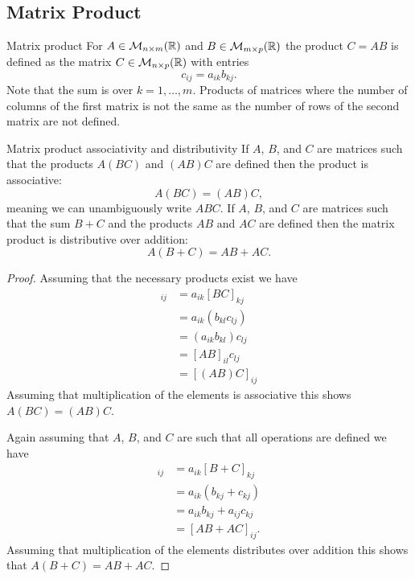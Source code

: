 \subsection{Matrix Product}
\begin{definition}{Matrix product}{}
    For \(A\in\mathcal{M}_{{n}\times{m}}({\mathbb{R}})\) and \(B\in\mathcal{M}_{{m}\times{p}}({\mathbb{R}})\) the product \(C = AB\) is defined as the matrix \(C\in\mathcal{M}_{{n}\times{p}}({\mathbb{R}})\) with entries
    \[c_{ij} = a_{ik}b_{kj}.\]
    Note that the sum is over \(k = 1, \dotsc, m\).
    Products of matrices where the number of columns of the first matrix is not the same as the number of rows of the second matrix are not defined.
\end{definition}
\begin{theorem}{Matrix product associativity and distributivity}{}
    If \(A\), \(B\), and \(C\) are matrices such that the products \(A(BC)\) and \((AB)C\) are defined then the product is associative:
    \[A(BC) = (AB)C,\]
    meaning we can unambiguously write \(ABC\).
    If \(A\), \(B\), and \(C\) are matrices such that the sum \(B + C\) and the products \(AB\) and \(AC\) are defined then the matrix product is distributive over addition:
    \[A(B + C) = AB + AC.\]
\end{theorem}
\begin{proof}
    Assuming that the necessary products exist we have
    \begin{align*}
        [A(BC)]_{ij} &= a_{ik}[BC]_{kj}\\
        &= a_{ik}(b_{kl}c_{lj})\\
        &= (a_{ik}b_{kl})c_{lj}\\
        &= [AB]_{il}c_{lj}\\
        &= [(AB)C]_{ij}
    \end{align*}
    Assuming that multiplication of the elements is associative this shows \(A(BC) = (AB)C\).
    
    Again assuming that \(A\), \(B\), and \(C\) are such that all operations are defined we have
    \begin{align*}
        [A(B + C)]_{ij} &= a_{ik}[B + C]_{kj}\\
        &= a_{ik}(b_{kj} + c_{kj})\\
        &= a_{ik}b_{kj} + a_{ij}c_{kj}\\
        &= [AB + AC]_{ij}.
    \end{align*}
    Assuming that multiplication of the elements distributes over addition this shows that \(A(B + C) = AB + AC\).
\end{proof}
